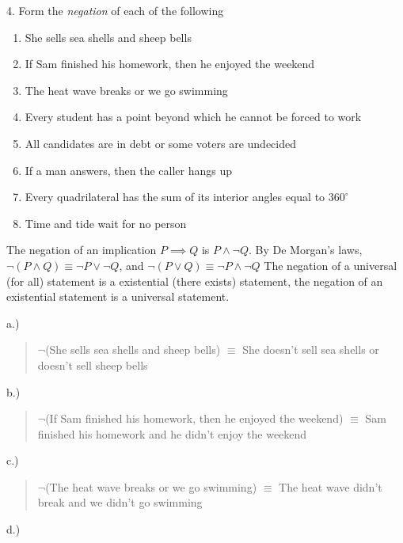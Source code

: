 \documentclass{report}
\begin{document}
    \bigbreak \noindent 
    \begin{mdframed}
        4. Form the \textit{negation} of each of the following
        \begin{enumerate}[label=(\alph*)]
            \item She sells sea shells and sheep bells
            \item If Sam finished his homework, then he enjoyed the weekend
            \item The heat wave breaks or we go swimming
            \item Every student has a point beyond which he cannot be forced to work
            \item All candidates are in debt or some voters are undecided
            \item If a man answers, then the caller hangs up
            \item Every quadrilateral has the sum of its interior angles equal to $360^{\circ}$
            \item Time and tide wait for no person
        \end{enumerate}
    \end{mdframed}
    \bigbreak \noindent 
    \begin{remark}
        The negation of an implication $P \implies Q$ is $P \land \neg Q $. By De Morgan's laws, $\neg(P \land Q) \equiv \neg P \lor \neg Q$, and $\neg(P\lor Q)  \equiv \neg P \land \neg Q$
        \bigbreak \noindent 
        The negation of a universal (for all) statement is a existential (there exists) statement, the negation of an existential statement is a universal statement.
    \end{remark}
    \bigbreak \noindent 
    a.) 
    \begin{quote}
       $\neg$(She sells sea shells and sheep bells) $\equiv$ She doesn't sell sea shells or doesn't sell sheep bells
    \end{quote}
    \bigbreak \noindent 
    b.) 
    \begin{quote}
       $\neg$(If Sam finished his homework, then he enjoyed the weekend) $\equiv$ Sam finished his homework and he didn't enjoy the weekend
    \end{quote}
    \bigbreak \noindent 
    c.) 
    \begin{quote}
       $\neg$(The heat wave breaks or we go swimming) $\equiv$ The heat wave didn't break and we didn't go swimming 
    \end{quote}
    \bigbreak \noindent 
    d.) 
\end{document}
